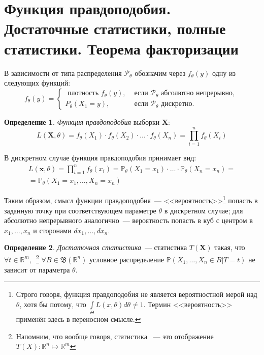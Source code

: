 \documentclass[oneside,final,14pt]{extreport}
\theoremstyle{plain}
\theoremstyle{definition}
\newtheorem*{defn}{Определение}
\theoremstyle{named}
\begin{document}
\section{Функция правдоподобия. Достаточные статистики, полные статистики. Теорема факторизации}

В зависимости от типа распределения $\mathcal{P}_\theta$ обозначим через $f_{\theta}(y)$ одну из следующих функций:
\begin{equation*}
    f_{\theta}(y) =
    \left\{\begin{array}{ll}
    \text { плотность } f_{\theta}(y), & \text { если } \mathcal{P}_{\theta} \text { абсолютно непрерывно, } \\
    P_{\theta}\left(X_{1}=y\right), & \text { если } \mathcal{P}_{\theta} \text { дискретно. }
    \end{array}\right.
\end{equation*}

\begin{defn}
{\it Функция правдоподобия} выборки $\mathbf{X}$:
\begin{equation*}
    L(\mathbf{X} , \theta)=f_{\theta}\left(X_{1}\right) \cdot f_{\theta}\left(X_{2}\right) \cdot \ldots \cdot f_{\theta}\left(X_{n}\right)=\prod_{i=1}^{n} f_{\theta}\left(X_{i}\right)
\end{equation*}
\end{defn}

В дискретном случае функция правдоподобия принимает вид:
\begin{equation*}
\begin{aligned}
    L(\mathbf{x} , \theta)=\prod_{i=1}^{n} f_{\theta}(x_{i}) 
    = \mathbb{P}_{\theta}(X_{1}=x_{1}) \cdot \ldots \cdot \mathbb{P}_{\theta}(X_{n}=x_{n}) = \\
    = \mathbb{P}_{\theta}(X_{1}=x_{1}, \ldots, X_{n}=x_{n})
\end{aligned}
\end{equation*}

Таким образом, смысл функции правдоподобия~--- <<вероятность>>\footnote{Строго говоря, функция правдоподобия не является вероятностной мерой над $\theta$, хотя бы потому, что $\int\limits_{\Theta} L(x, \theta) d\theta \neq 1$. Термин <<вероятность>> применён здесь в переносном смысле.} попасть в заданную точку при соответствующем параметре $\theta$ в дискретном случае; для абсолютно непрерывного аналогично~--- вероятность попасть в куб с центром в $x_1, \ldots, x_n$ и сторонами $dx_1, \ldots, dx_n$.

\begin{defn}
{\it Достаточная статистика}~--- статистика $T(\mathbf{X})$ такая, что $\forall t \in \mathbb{R}^m,$~\footnote{Напомним, что вообще говоря, статистика ~--- это отображение $T(X): \mathbb{R}^n \mapsto \mathbb{R}^m$ } $ \forall B \in \mathfrak{B}(\mathbb{R}^{n})$ условное распределение $\mathbb{P}(X_1, \ldots, X_n \in B | T=t)$ не зависит от параметра $\theta$.
\end{defn}
\end{document}
